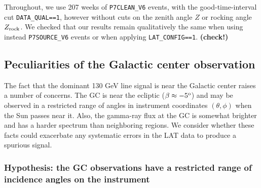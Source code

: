 \documentclass[aps,twocolumn,prd,superscriptaddress,showpacs,nofootinbib,fixfloat]{revtex4}
\newcommand{\degree}{^{\rm o}}
\newcommand{\zrock}{$Z_{\rm rock}$}
\begin{document}
Throughout, we use 207 weeks of \texttt{P7CLEAN\_V6} events,
with the good-time-interval cut \texttt{DATA\_QUAL==1},
however without cuts on the zenith angle $Z$ or rocking
angle \zrock. We checked that our results remain
qualitatively the same when using instead
\texttt{P7SOURCE\_V6} events or when applying
\texttt{LAT\_CONFIG==1}. \textbf{(check!)}


\subsection{Peculiarities of the Galactic center observation}

The fact that the dominant 130 GeV line signal is near the Galactic center
raises a number of concerns.  The GC is near the ecliptic ($\beta \approx
-5\degree$) and may be observed in a restricted range of angles in instrument
coordinates $(\theta, \phi)$ when the Sun passes near it.  Also, the gamma-ray
flux at the GC is somewhat brighter and has a harder spectrum than neighboring
regions.  We consider whether these facts could exacerbate any systematic
errors in the LAT data to produce a spurious signal.

\subsubsection{Hypothesis: the GC observations have a restricted range of
incidence angles on the instrument}
\end{document}
